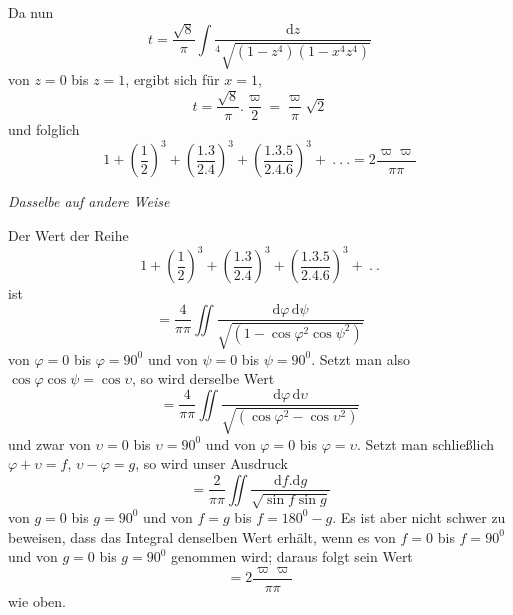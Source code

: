 Da nun
\[
t=\frac{\surd 8}{\pi}\int\frac{\mathrm dz}{{}^{4}\!\surd{(1-z^4)(1-x^4z^4)}}
\]
von $z=0$ bis $z=1$, ergibt sich für $x=1$,
\[
t=\frac{\surd 8}{\pi}.\frac{\varpi}{2}=\frac{\varpi}{\pi}\surd 2
\]
und folglich
\[
1+\left(\frac12\right)^3+\left(\frac{1.3}{2.4}\right)^3+
\left(\frac{1.3.5}{2.4.6}\right)^3+\ .\ .\ .=2\frac{\varpi\varpi}{\pi\pi}
\]
\begin{center}\textit{Dasselbe auf andere Weise}\end{center}
Der Wert der Reihe
\[
1+\left(\frac12\right)^3+\left(\frac{1.3}{2.4}\right)^3+
\left(\frac{1.3.5}{2.4.6}\right)^3+\ .\ .
\]
ist
\[
=\frac4{\pi\pi}\iint\frac{\mathrm d\varphi\,\mathrm d\psi}{\surd {(1-\cos\varphi^2\cos\psi^2)}}
\]
von $\varphi=0$ bis $\varphi=90^0$ und von $\psi=0$ bis $\psi=90^0$.
Setzt man also $\cos\varphi\cos\psi=\cos\upsilon$, so wird derselbe Wert
\[
=\frac4{\pi\pi}\iint\frac{\mathrm d\varphi\,\mathrm d\upsilon}{\surd {(\cos\varphi^2-\cos\upsilon^2)}}
\]
und zwar von $\upsilon=0$ bis $\upsilon=90^0$ und von $\varphi=0$ bis $\varphi=\upsilon$.
Setzt man schließlich $\varphi+\upsilon=f$, $\upsilon-\varphi=g$, so wird unser Ausdruck
\[
=\frac2{\pi\pi}\iint\frac{\mathrm df.\mathrm dg}{\surd {\sin f\sin g}}
\]
von $g=0$ bis $g=90^0$ und von $f=g$ bis $f=180^0-g$.
Es ist aber nicht schwer zu beweisen, dass das Integral denselben Wert erhält, wenn es
von $f=0$ bis $f=90^0$ und von $g=0$ bis $g=90^0$ genommen wird; daraus folgt sein Wert
\[
=2\frac{\varpi\varpi}{\pi\pi}
\]
wie oben.

\clearpage
\endgroup
